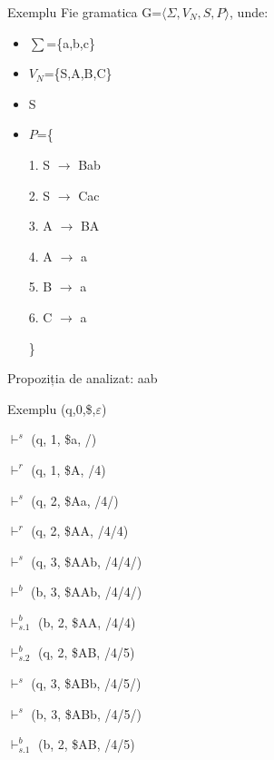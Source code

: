 \documentclass[pdf]{beamer}
\begin{document}
\begin{frame}{Exemplu}
Fie gramatica G=$\langle \Sigma, V_N, S, P \rangle$, unde:

\begin{itemize}
\item
$\sum$=\{a,b,c\}
\item
$V_N$=\{S,A,B,C\}
\item
S
\item
$P$=\{

\hspace{1cm} 1. S $\rightarrow$ Bab

\hspace{1cm} 2. S $\rightarrow$ Cac

\hspace{1cm} 3. A $\rightarrow$ BA

\hspace{1cm} 4. A $\rightarrow$ a

\hspace{1cm} 5. B $\rightarrow$ a

\hspace{1cm} 6. C $\rightarrow$ a

\}
\end{itemize}

Propoziția de analizat: aab
\end{frame}



\begin{frame}{Exemplu}
(q,0,\$,$\varepsilon$)

$\vdash^{s}$ (q, 1, \$a, /)

$\vdash^{r}$ (q, 1, \$A, /4)

$\vdash^{s}$ (q, 2, \$Aa, /4/)

$\vdash^{r}$ (q, 2, \$AA, /4/4)

$\vdash^{s}$ (q, 3, \$AAb, /4/4/)

$\vdash^{b}$ (b, 3, \$AAb, /4/4/)

$\vdash^{b}_{s.1}$ (b, 2, \$AA, /4/4)

$\vdash^{b}_{s.2}$ (q, 2, \$AB, /4/5)

$\vdash^{s}$ (q, 3, \$ABb, /4/5/)

$\vdash^{s}$ (b, 3, \$ABb, /4/5/)

$\vdash^{b}_{s.1}$ (b, 2, \$AB, /4/5)
\end{frame}
\end{document}
